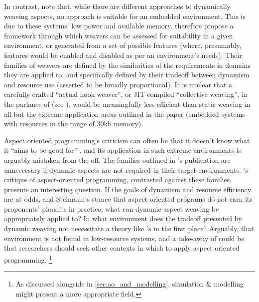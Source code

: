In contrast, \citeauthor{gilani2004family} note that, while there are different
approaches to dynamically weaving aspects, no approach is suitable for an
embedded environment. This is due to these systems' low power and available
memory. \citeauthor{gilani2004family} therefore propose a framework through
which weavers can be assessed for suitability in a given environment, or
generated from a set of possible features (where, presumably, features would be
enabled and disabled as per an environment's needs). Their families of weavers
are defined by the similarities of the requirements in domains they are applied
to, and specifically defined by their tradeoff between dynamism and resource use
(asserted to be broadly proportional). It is unclear that a carefully crafted
``actual hook weaver'', or JIT-compiled ``collective weaving'', in the parlance
of \citeauthor{dynamicAOchitchyan} (see \citep{dynamicAOchitchyan}), would be
meaningfully less efficient than static weaving in all but the extreme
application areas outlined in the paper (embedded systems with resources in the
range of 30kb memory).

Aspect oriented programming's criticism can often be that it doesn't know what
it ``aims to be good for'' , and its application in such extreme environments is
arguably mistaken from the off. The families outlined in
\citeauthor{gilani2004family}'s publication are unneccesary if dynamic aspects
are not required in their target environments.
's critique of aspect-oriented programming,
contrasted against these families, presents an interesting question. If the
goals of dynamism and resource efficiency are at odds, and Steimann's stance
that aspect-oriented programs do not earn its proponents' plaudits in practice,
what can dynamic aspect weaving be appropriately applied to? In what environment
does the tradeoff presented by dynamic weaving not necessitate a theory like
\citeauthor{gilani2004family}'s in the first place? Arguably, that environment
is not found in low-resource systems, and a take-away of \cite{gilani2004family}
could be that researchers should seek other contexts in which to apply aspect
oriented programming. \footnote{As discussed alongside \cite{gulyas1999use} in
\cref{sec:ao_and_modelling}, simulation \& modelling might present a more
appropriate field.}




